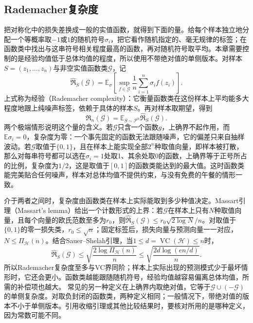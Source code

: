 \subsection{Rademacher复杂度}

把对称化中的损失差换成一般的实值函数，就得到下面的量。给每个样本独立地分配一个等概率取$-1$或$1$的随机符号$\sigma_i$，把它看作随机指定的、毫无规律的标签；在函数类中找出与这串符号相关程度最高的函数，再对随机符号取平均。本章需要控制的是经验均值低于总体均值的程度，所以使用不带绝对值的单侧版本。对样本$S=(z_1,\ldots,z_n)$与非空实值函数类$\mathcal G$，记
\begin{equation}
 \widehat{\mathfrak R}_S(\mathcal G)
 =\mathbb E_\sigma\left[\sup_{f\in\mathcal G}
       \frac1n\sum_{i=1}^n\sigma_i f(z_i)\right].
 \label{eq:learning-empirical-rademacher}
\end{equation}
上式称为经验（Rademacher complexity）：它衡量函数类在这份样本上平均能多大程度地跟上纯噪声标签，依赖于具体的样本$S$。再对样本取期望，得到
\[
 \mathfrak R_n(\mathcal G)=\mathbb E_{S\sim\mathcal P^n}
       \widehat{\mathfrak R}_S(\mathcal G).
\]
两个极端情形说明这个量的含义。若$\mathcal G$只含一个函数$g$，上确界不起作用，而$\mathbb E\sigma_i=0$，复杂度为零：一个事先固定的函数无法跟随噪声，它的偏差只来自抽样波动。若$\mathcal G$取值于$\{0,1\}$，且在样本上能实现全部$2^n$种取值向量，即样本被打散，那么对每串符号都可以选在$\sigma_i=1$处取1、其余处取0的函数，上确界等于正号所占的比例，复杂度为$1/2$，这是取值于$[0,1]$的函数类能达到的最大值。这时函数类能完美贴合任何噪声，样本对总体均值不提供约束，与没有免费的午餐的情形一致。

介于两者之间时，复杂度由函数类在样本上实际能取到多少种值决定。Massart引理（Massart's lemma）给出一个计数形式的上界：若$\mathcal G$在样本上只有$N$种取值向量，且每个向量的欧氏范数至多为$r_0$，则$\widehat{\mathfrak R}_S(\mathcal G)\leq r_0\sqrt{2\log N}/n$。对取值于$\{0,1\}$的零一损失类，$r_0\leq\sqrt n$；固定标签后，损失向量与预测向量一一对应，$N\leq\Pi_{\mathcal H}(n)$。结合Sauer--Shelah引理，当$1\leq d=\operatorname{VC}(\mathcal H)\leq n$时，
\begin{equation}
 \widehat{\mathfrak R}_S(\mathcal G)\leq\sqrt{\frac{2\log\Pi_{\mathcal H}(n)}{n}}\leq\sqrt{\frac{2d\log(en/d)}{n}}.
 \label{eq:rademacher-vc-comparison}
\end{equation}
所以Rademacher复杂度至多与VC界同阶；样本上实际出现的预测模式少于最坏情形时，它还会更小。函数类越能跟随随机符号，经验均值越容易偏离总体均值，所需的补偿项也越大。
常见的另一种定义在上确界内取绝对值，它等于$\mathcal G\cup(-\mathcal G)$的单侧复杂度。对取负封闭的函数类，两种定义相同；一般情况下，带绝对值的版本不小于单侧版本。引用收缩引理或其他比较结果时，要核对所用的是哪种定义，因为常数可能不同。

